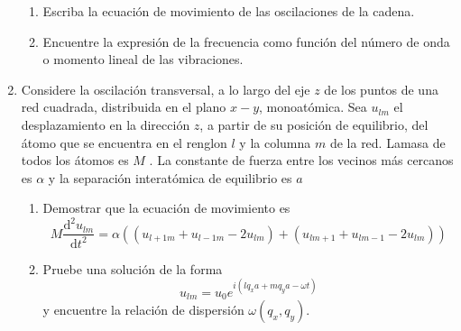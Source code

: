 \documentclass[]{article}
\begin{document}
\begin{enumerate}
  \begin{enumerate}
  \item Escriba la ecuación de movimiento de las oscilaciones de la cadena.
  \item Encuentre la expresión de la frecuencia como función del número de onda o momento lineal de las vibraciones.
  \end{enumerate}
\item Considere la oscilación transversal, a lo largo del eje $z$ de los puntos de una red cuadrada, distribuida en el plano $x-y$, monoatómica. Sea $u_{lm}$ el desplazamiento en la dirección $z$, a partir de su posición de equilibrio, del átomo que se encuentra en el renglon $l$ y la columna $m$ de la red. Lamasa de todos los átomos es $M$ . La constante de fuerza entre los vecinos más cercanos es $\alpha$ y la separación interatómica de equilibrio es $a$
  \begin{enumerate}
  \item Demostrar que la ecuación de movimiento es
$$M\frac{\mathrm{d}^2u_{lm}}{\mathrm{d}t^2}=\alpha\left(\left(u_{l+1 m}+u_{l-1m}-2u_{lm}\right)+\left(u_{l m+1}+u_{lm-1}-2u_{lm}\right)\right)
$$
\item Pruebe una solución de la forma
$$
u_{lm}=u_0 e^{i\left(lq_xa+mq_ya-\omega t\right)}
$$
y encuentre la relación de dispersión $\omega(q_x,q_y)$.
  \end{enumerate}

\end{enumerate}
\end{document}
